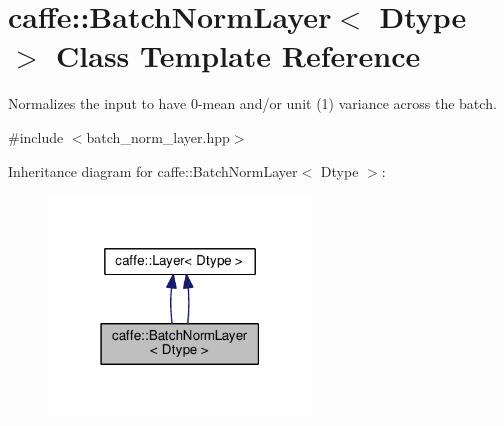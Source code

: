 \hypertarget{classcaffe_1_1_batch_norm_layer}{}\section{caffe\+:\+:Batch\+Norm\+Layer$<$ Dtype $>$ Class Template Reference}
\label{classcaffe_1_1_batch_norm_layer}


Normalizes the input to have 0-\/mean and/or unit (1) variance across the batch.  




{\ttfamily \#include $<$batch\+\_\+norm\+\_\+layer.\+hpp$>$}



Inheritance diagram for caffe\+:\+:Batch\+Norm\+Layer$<$ Dtype $>$\+:
\nopagebreak
\begin{figure}[H]
\begin{center}
\leavevmode
\includegraphics[width=198pt]{classcaffe_1_1_batch_norm_layer__inherit__graph}
\end{center}
\end{figure}
